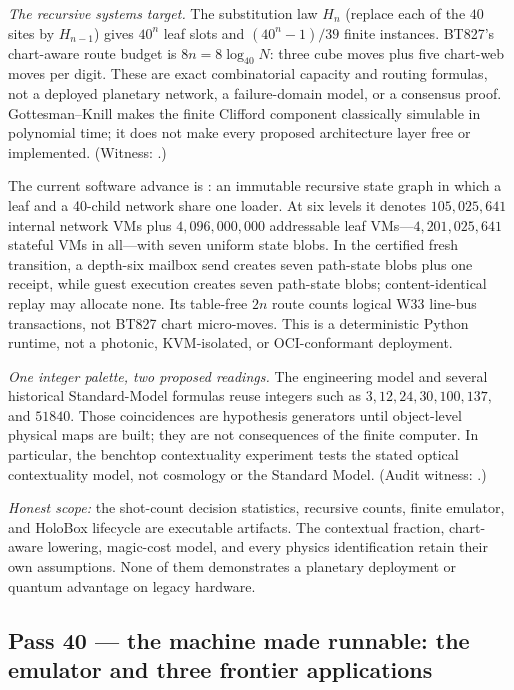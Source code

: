 \documentclass[11pt]{article}
\begin{document}
\emph{The recursive systems target.} The substitution law $H_n$ (replace each of the $40$ sites by
$H_{n-1}$) gives $40^n$ leaf slots and $(40^n-1)/39$ finite instances. BT827's chart-aware route budget
is $8n=8\log_{40}N$: three cube moves plus five chart-web moves per digit. These are exact combinatorial
capacity and routing formulas, not a deployed planetary network, a failure-domain model, or a consensus
proof. Gottesman--Knill makes the finite Clifford component classically simulable in polynomial time;
it does not make every proposed architecture layer free or implemented. (Witness:
.)

The current software advance is : an immutable recursive state graph in which
a leaf and a 40-child network share one loader. At six levels it denotes $105{,}025{,}641$ internal
network VMs plus $4{,}096{,}000{,}000$ addressable leaf VMs---$4{,}201{,}025{,}641$ stateful VMs in
all---with seven uniform state blobs. In the certified fresh transition, a depth-six mailbox send
creates seven path-state blobs plus one receipt, while guest execution creates seven path-state blobs;
content-identical replay may allocate none. Its table-free $2n$ route counts logical W33 line-bus
transactions, not BT827 chart micro-moves. This is a deterministic Python runtime, not a photonic,
KVM-isolated, or OCI-conformant deployment.

\emph{One integer palette, two proposed readings.} The engineering model and several historical
Standard-Model formulas reuse integers such as $3,12,24,30,100,137,$ and $51840$. Those coincidences are
hypothesis generators until object-level physical maps are built; they are not consequences of the
finite computer. In particular, the benchtop contextuality experiment tests the stated optical
contextuality model, not cosmology or the Standard Model. (Audit witness:
.)

\emph{Honest scope:} the shot-count decision statistics, recursive counts, finite emulator, and HoloBox
lifecycle are executable artifacts. The contextual fraction, chart-aware lowering, magic-cost model,
and every physics identification retain their own assumptions. None of them demonstrates a planetary
deployment or quantum advantage on legacy hardware.

\subsection{Pass 40 --- the machine made runnable: the emulator and three frontier applications}
\label{sec:capstone-forty}
\end{document}
